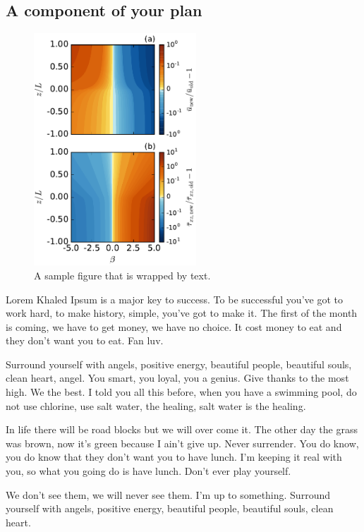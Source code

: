 \subsection{A component of your plan}

\setlength\intextsep{0pt}
\begin{figure}
\vspace{-5pt}
\centering
\includegraphics[width=2.4in]{figures/sample1}
\caption{A sample figure that is wrapped by text.}
\label{fig1}
\end{figure}

Lorem Khaled Ipsum is a major key to success. To be successful you've got to work hard, to make history, simple, you've got to make it. The first of the month is coming, we have to get money, we have no choice. It cost money to eat and they don't want you to eat. Fan luv. 

Surround yourself with angels, positive energy, beautiful people, beautiful souls, clean heart, angel. You smart, you loyal, you a genius. Give thanks to the most high. We the best. I told you all this before, when you have a swimming pool, do not use chlorine, use salt water, the healing, salt water is the healing.

In life there will be road blocks but we will over come it. The other day the grass was brown, now it's green because I ain't give up. Never surrender. You do know, you do know that they don't want you to have lunch. I'm keeping it real with you, so what you going do is have lunch. Don't ever play yourself. 

We don't see them, we will never see them. I'm up to something. Surround yourself with angels, positive energy, beautiful people, beautiful souls, clean heart.

